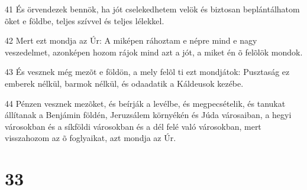 \par 41 És örvendezek bennök, ha jót cselekedhetem velök és biztosan beplántálhatom  õket e földbe, teljes szívvel és teljes lélekkel.
\par 42 Mert ezt mondja az Úr: A miképen ráhoztam e népre mind e nagy veszedelmet, azonképen hozom rájok mind azt a jót, a miket én õ felõlök mondok.
\par 43 És vesznek még mezõt e földön, a mely felõl ti ezt mondjátok: Pusztaság ez emberek nélkül, barmok nélkül, és odaadatik a Káldeusok kezébe.
\par 44 Pénzen vesznek mezõket, és beírják a levélbe, és megpecsételik, és tanukat állítanak a Benjámin földén, Jeruzsálem környékén és Júda városaiban, a hegyi városokban és a síkföldi városokban és a dél felé való városokban, mert visszahozom az õ foglyaikat, azt mondja az Úr.

\chapter{33}

